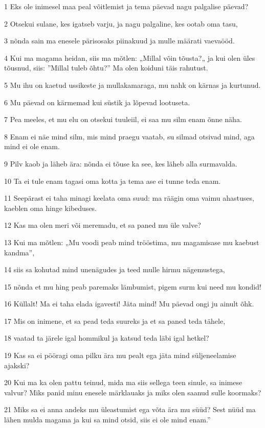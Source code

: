 \par 1 Eks ole inimesel maa peal võitlemist ja tema päevad nagu palgalise päevad?
\par 2 Otsekui sulane, kes igatseb varju, ja nagu palgaline, kes ootab oma tasu,
\par 3 nõnda sain ma enesele pärisosaks piinakuud ja mulle määrati vaevaööd.
\par 4 Kui ma magama heidan, siis ma mõtlen: „Millal võin tõusta?„ ja kui olen üles tõusnud, siis: ”Millal tuleb õhtu?” Ma olen koiduni täis rahutust.
\par 5 Mu ihu on kaetud ussikeste ja mullakamaraga, mu nahk on kärnas ja kurtunud.
\par 6 Mu päevad on kärmemad kui süstik ja lõpevad lootuseta.
\par 7 Pea meeles, et mu elu on otsekui tuuleiil, ei saa mu silm enam õnne näha.
\par 8 Enam ei näe mind silm, mis mind praegu vaatab, su silmad otsivad mind, aga mind ei ole enam.
\par 9 Pilv kaob ja läheb ära: nõnda ei tõuse ka see, kes läheb alla surmavalda.
\par 10 Ta ei tule enam tagasi oma kotta ja tema ase ei tunne teda enam.
\par 11 Seepärast ei taha minagi keelata oma suud: ma räägin oma vaimu ahastuses, kaeblen oma hinge kibeduses.
\par 12 Kas ma olen meri või meremadu, et sa paned mu üle valve?
\par 13 Kui ma mõtlen: „Mu voodi peab mind trööstima, mu magamisase mu kaebust kandma”,
\par 14 siis sa kohutad mind unenägudes ja teed mulle hirmu nägemustega,
\par 15 nõnda et mu hing peab paremaks lämbumist, pigem surm kui need mu kondid!
\par 16 Küllalt! Ma ei taha elada igavesti! Jäta mind! Mu päevad ongi ju ainult õhk.
\par 17 Mis on inimene, et sa pead teda suureks ja et sa paned teda tähele,
\par 18 vaatad ta järele igal hommikul ja katsud teda läbi igal hetkel?
\par 19 Kas sa ei pööragi oma pilku ära mu pealt ega jäta mind süljeneelamise ajakski?
\par 20 Kui ma ka olen pattu teinud, mida ma siis sellega teen sinule, sa inimese valvur? Miks panid minu enesele märklauaks ja miks olen saanud sulle koormaks?
\par 21 Miks sa ei anna andeks mu üleastumist ega võta ära mu süüd? Sest nüüd ma lähen mulda magama ja kui sa mind otsid, siis ei ole mind enam.”

